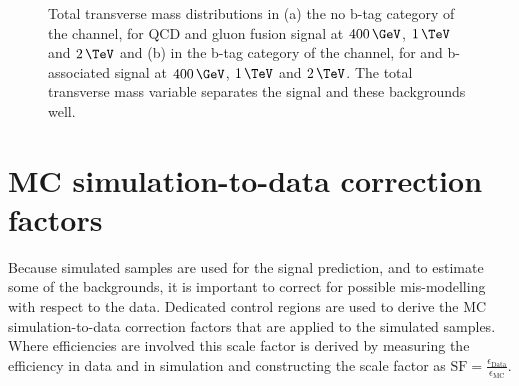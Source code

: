 \begin{figure}[h!]
\begin{center}
\end{center}
\caption[Total transverse mass distributions in the no b-tag category of the
\tautau channel for QCD and gluon fusion signal, and in the b-tag category
of the \emu channel, for \ttbar and b-associated signal.]{Total transverse mass distributions in (a) the no b-tag category of the \tautau
channel, for QCD and gluon fusion signal at $400\,\GeV$, $1\,\TeV$ and $2\,\TeV$ and (b) in the b-tag
category of the \emu channel, for \ttbar and b-associated signal at $400\,\GeV$, $1\,\TeV$ and $2\,\TeV$. 
The total transverse mass variable separates the signal and these backgrounds well.}
\label{fig:mttot_sigseps}
\end{figure}



\section{\acl{MC} simulation-to-data correction factors}
\label{sec:mssm_mccorrs}
Because simulated samples are used for the signal prediction, and 
to estimate some of the backgrounds, it is important to correct for possible 
mis-modelling with respect to the data. Dedicated control regions 
are used to derive the \ac{MC} simulation-to-data correction factors
that are applied to the simulated samples. Where efficiencies
are involved this scale factor is derived by measuring the efficiency
in data and in simulation and constructing the scale factor as $\text{SF}=\frac{\epsilon_{\text{Data}}}{\epsilon_{\text{MC}}}$.
